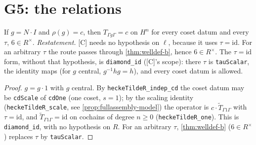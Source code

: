 \section{G5: the relations}

\begin{proposition}\label{prop:diamond-model}
  \leanok
  If $g=N\cdot I$ and $\rho(g)=c$, then $T_{\Gamma g\Gamma}=c$ on $H^n$ for every coset datum and every $\tau$, $6\in R^\times$.
  \emph{Restatement.} [C] needs no hypothesis on $\ell$, because it uses $\tau=\mathrm{id}$. For an arbitrary $\tau$ the route
  passes through \ref{thm:welldef-b}, hence $6\in R^\times$. The $\tau=\mathrm{id}$ form, without that hypothesis, is
  \texttt{diamond\_id} ([C]'s scope): there $\tau$ is \texttt{tauScalar}, the identity maps (for $g$ central,
  $g^{-1}hg=h$), and every coset datum is allowed.
\end{proposition}
\begin{proof}
  \leanok
  $g=g\cdot1$ with $g$ central. By \texttt{heckeTildeR\_indep\_cd} the coset datum may be \texttt{cdScale} of \texttt{cdOne} (one
  coset, $s=1$); by the scaling identity (\texttt{heckeTildeR\_scale}, see \ref{prop:fullassembly-model}) the operator is
  $c\cdot\widetilde T_{\Gamma1\Gamma}$ with $\tau=\mathrm{id}$, and $\widetilde T_{\Gamma1\Gamma}=\mathrm{id}$ on cochains of degree
  $n\ge0$ (\texttt{heckeTildeR\_one}). This is \texttt{diamond\_id}, with no hypothesis on $R$. For an arbitrary $\tau$,
  \ref{thm:welldef-b} ($6\in R^\times$) replaces $\tau$ by \texttt{tauScalar}.
\end{proof}

